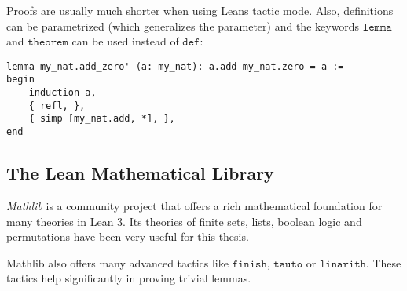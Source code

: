 Proofs are usually much shorter when using Leans tactic mode.
Also, definitions can be parametrized (which generalizes the parameter) and the keywords $\mathtt{lemma}$ and $\mathtt{theorem}$ can be used instead of $\mathtt{def}$:
\begin{verbatim}
lemma my_nat.add_zero' (a: my_nat): a.add my_nat.zero = a :=
begin
    induction a,
    { refl, },
    { simp [my_nat.add, *], },
end
\end{verbatim}

\subsection{The Lean Mathematical Library}

\textit{Mathlib} \cite{mathlibOverview} is a community project that offers a rich mathematical foundation for many theories in Lean 3.
Its theories of finite sets, lists, boolean logic and permutations have been very useful for this thesis.

Mathlib also offers many advanced tactics like $\mathtt{finish}$, $\mathtt{tauto}$ or $\mathtt{linarith}$.
These tactics help significantly in proving trivial lemmas.
